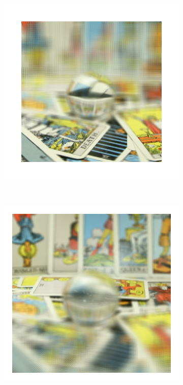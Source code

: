 \documentclass[11pt,a4paper,titlepage]{article}
\begin{document}
\begin{figure}
\begin{subfigure}[t]{0.19\textwidth}
	\end{subfigure}%
	~
	\begin{subfigure}[t]{0.19\textwidth}
		\includegraphics[width=\textwidth]{results/tarot_back_projection/sensorPlaneZ=-0.5/Back_Projection_layer_5.png} 
	\end{subfigure}%
	\\
	\begin{subfigure}[t]{0.19\textwidth}
		\includegraphics[width=\textwidth]{results/tarot_back_projection/sensorPlaneZ=-3/Back_Projection_layer_1.png} 

\end{subfigure}
\end{figure}
\end{document}
